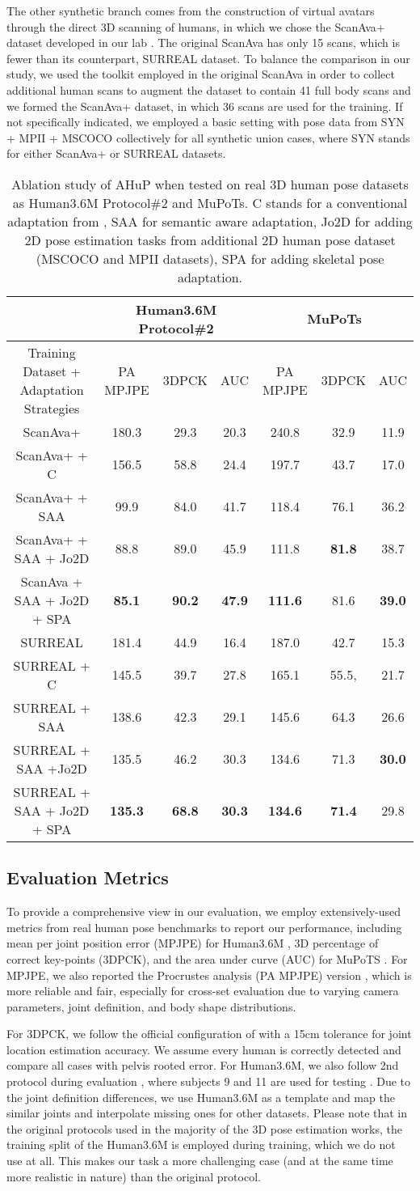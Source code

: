 \documentclass[twocolumn]{svjour3}          \smartqed  \usepackage{graphicx}
\newcommand{\tblAbla}{
\begin{table*}[t]
\caption{Ablation study of AHuP when tested on real 3D human pose datasets as Human3.6M Protocol\#2 and MuPoTs. C stands for a conventional adaptation from \cite{chen2016synthesizing,long2015learning,sun2016deep}, SAA for semantic aware adaptation, Jo2D for  adding 2D pose estimation tasks from additional 2D human pose dataset (MSCOCO and MPII datasets), SPA for adding skeletal pose adaptation.}
 \vspace{-.2in}
\begin{center}
\footnotesize
\begin{tabular}{c | *3c || *3c  }   \hline
  & \multicolumn{3}{c||}{Human3.6M Protocol\#2} &\multicolumn{3}{c}{MuPoTs}\\
  \hline
  Training Dataset + Adaptation Strategies  & PA MPJPE  & 3DPCK & AUC  & PA MPJPE  & 3DPCK & AUC  \\ 
    \hline 
ScanAva+ \cite{liu2018semi}   &  180.3 & 29.3 & 20.3  & 
            240.8 & 32.9 & 11.9 \\
 ScanAva+ + C \cite{chen2016synthesizing} &    156.5 & 58.8 & 24.4 &
           197.7 & 43.7  &  17.0 \\
 ScanAva+ + SAA &  99.9 & 84.0 & 41.7 &
            118.4 & 76.1 & 36.2 \\
 ScanAva+ + SAA + Jo2D &  88.8 & 89.0 & 45.9 & 
    111.8 & \textbf{81.8} & 38.7\\ 
 ScanAva + SAA + Jo2D + SPA & \textbf{85.1} & \textbf{90.2} & \textbf{47.9}  &
       \textbf{111.6} & 81.6 & \textbf{39.0}  \\ 
\hline
  \hline
  SURREAL \cite{varol17_surreal} & 181.4  &  44.9  & 16.4 &
                187.0 & 42.7 &  15.3 \\
 SURREAL + C \cite{chen2016synthesizing} &   145.5 & 39.7 & 27.8  & 
                165.1 & 55.5,& 21.7 \\
 SURREAL + SAA &  138.6 & 42.3 & 29.1 & 
        145.6  &  64.3  & 26.6 \\
  SURREAL + SAA +Jo2D &  135.5 &  46.2 & 30.3 & 
                134.6 & 71.3 & \textbf{30.0} \\
 SURREAL + SAA + Jo2D + SPA & \textbf{135.3} &  \textbf{68.8} & \textbf{30.3} & 
            \textbf{134.6}  &  \textbf{71.4} & 29.8\\
 \hline
\end{tabular}
\label{tbl:abla}
 \vspace{-.2in}
\end{center}
\end{table*}
}
\begin{document}
The other synthetic branch comes from the construction of virtual avatars through the direct 3D scanning of humans, in which  we chose the ScanAva+ dataset developed in our lab \cite{liu2018semi}. 
The original ScanAva has only 15 scans, which is fewer than its counterpart, SURREAL dataset. To balance the comparison in our study, we used the toolkit employed in the original ScanAva in order to collect additional human scans to augment the dataset to contain 41 full body scans and we formed the ScanAva+ dataset, in which 36 scans are used for the training. 
If not specifically indicated, we employed a basic setting with pose data from SYN + MPII + MSCOCO collectively  for all synthetic union cases, where SYN stands for either ScanAva+ or SURREAL datasets. 



\tblAbla
\subsection{Evaluation Metrics}

To provide a comprehensive view in our evaluation, we employ extensively-used metrics from real human pose benchmarks to report our performance, including mean per joint position error (MPJPE) for Human3.6M \cite{h36m_pami}, 3D percentage of correct key-points (3DPCK), and the area under curve (AUC) for MuPoTS \cite{singleshotmultiperson2018}. 
For MPJPE, we also reported the Procrustes analysis (PA MPJPE) version
\cite{gower1975generalized}, which is more reliable and fair, especially for cross-set evaluation due to varying camera parameters, joint definition, and body shape distributions. 


For 3DPCK, we follow the official configuration of \cite{singleshotmultiperson2018} with a 15cm tolerance for joint location estimation accuracy. We assume every human is correctly detected and compare all cases with pelvis rooted error. For Human3.6M, we also follow 2nd protocol during evaluation \cite{yasin2016dual,moon2019camera}, 
where subjects 9 and 11 are used for testing \cite{bogo2016keep}. Due to the joint definition differences, we use Human3.6M as a template and map the similar joints and interpolate missing ones for other datasets. 
Please note that in the original protocols used in the majority of the 3D pose estimation works, the training split of the Human3.6M is employed during training, which we do not use at all. This makes our task a more challenging case (and at the same time more realistic in nature) than the original protocol. 
\end{document}
